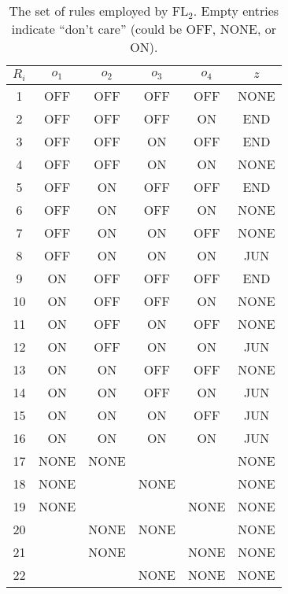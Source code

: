 \documentclass[twocolumn,natbib]{svjour3}
\begin{document}
\begin{table}
\caption{The set of rules employed by $\mathrm{FL}_{2}$. Empty entries indicate ``don't care'' (could be OFF, NONE, or ON).}
\label{tab:rules-FL2}
\centering
\begin{tabular}{c | c c c c | c }
$R_{i}$ & $o_{1}$   & $o_{2}$   & $o_{3}$   & $o_{4}$  & $z$ \\
\hline
1 & OFF  & OFF  & OFF  & OFF & NONE \\
2 & OFF  & OFF  & OFF  & ON  & END  \\
3 & OFF  & OFF  & ON   & OFF & END  \\
4 & OFF  & OFF  & ON   & ON  & NONE \\
\hline
5 & OFF  & ON   & OFF  & OFF & END  \\
6 & OFF  & ON   & OFF  & ON  & NONE \\
7 & OFF  & ON   & ON   & OFF & NONE \\
8 & OFF  & ON   & ON   & ON  & JUN  \\
\hline
9 & ON   & OFF  & OFF  & OFF & END  \\
10&ON   & OFF  & OFF  & ON  & NONE  \\
11&ON   & OFF  & ON   & OFF & NONE  \\
12&ON   & OFF  & ON   & ON  & JUN  \\
\hline
13&ON   & ON   & OFF  & OFF & NONE  \\
14&ON   & ON   & OFF  & ON  & JUN  \\
15&ON   & ON   & ON   & OFF & JUN  \\
16&ON   & ON   & ON   & ON  & JUN  \\
\hline
17&NONE & NONE &      &      & NONE \\
18&NONE &      & NONE &      & NONE \\
19&NONE &      &      & NONE & NONE \\
20&     & NONE & NONE &      & NONE \\
21&     & NONE &      & NONE & NONE \\
22&     &      & NONE & NONE & NONE \\     
\end{tabular}
\end{table}
\end{document}
